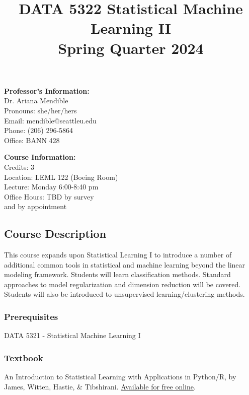 \documentclass[16pt]{article}
\date{}
\title{\vspace{-1.5cm}DATA 5322 Statistical Machine Learning II \\ Spring Quarter 2024 }
\begin{document}
	
	\maketitle
	
	\vspace{-1.5cm}
	
	\begin{minipage}[t]{0.37\linewidth}
		\textbf{Professor's Information:}\\
		{\sc Dr. Ariana Mendible}\\ %
		Pronouns: she/her/hers\\
		Email: mendible@seattleu.edu\\
		Phone: (206) 296-5864\\
		Office: BANN 428
	\end{minipage}
	\hfill 
	\begin{minipage}[t]{0.43\linewidth}
		\textbf{Course Information:} \\
		Credits: 3 \\
		Location: LEML 122 (Boeing Room) \\
		Lecture: Monday 6:00-8:40 {\sc pm} \\
		Office Hours: TBD by survey\\ and by appointment
	\end{minipage}
	
	\subsection*{Course Description}
	This course expands upon Statistical Learning I to introduce a number of additional common tools in statistical and machine learning beyond the linear modeling framework. Students will learn classification methods. Standard approaches to model regularization and dimension reduction will be covered. Students will also be introduced to unsupervised learning/clustering methods. 
	
	\subsubsection*{Prerequisites}
	DATA 5321 - Statistical Machine Learning I
	\subsubsection*{Textbook}
	An Introduction to Statistical Learning with Applications in Python/R, by James, Witten, Hastie, \& Tibshirani. \href{https://www.statlearning.com/}{Available for free online}.
\end{document}
